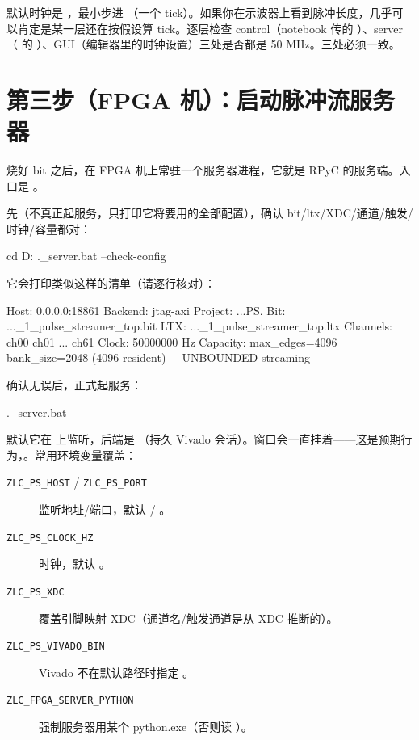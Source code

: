\documentclass[11pt,oneside,openany]{book}
\begin{document}
\begin{notebox}
默认时钟是 ，最小步进 （一个 tick）。如果你在示波器上看到脉冲长度，几乎可以肯定是某一层还在按假设算 tick。逐层检查 control（notebook 传的 ）、server（ 的 ）、GUI（编辑器里的时钟设置）三处是否都是 50 MHz。三处必须一致。
\end{notebox}

\section{第三步（FPGA 机）：启动脉冲流服务器}

烧好 bit 之后，在 FPGA 机上常驻一个服务器进程，它就是 RPyC 的服务端。入口是 。

先（不真正起服务，只打印它将要用的全部配置），确认 bit/ltx/XDC/通道/触发/时钟/容量都对：

\begin{codeblock}[PowerShell]
cd D:\ZLC
.\fpga\run_server.bat --check-config
\end{codeblock}

它会打印类似这样的清单（请逐行核对）：

\begin{codeblock}[text]
Host:    0.0.0.0:18861
Backend: jtag-axi
Project: ...\fpga\build\ps
Bit:     ...\impl_1\zlc_pulse_streamer_top.bit
LTX:     ...\impl_1\zlc_pulse_streamer_top.ltx
Channels: ch00 ch01 ... ch61
Clock:   50000000 Hz
Capacity: max_edges=4096 bank_size=2048 (4096 resident) + UNBOUNDED streaming
\end{codeblock}

确认无误后，正式起服务：

\begin{codeblock}[PowerShell]
.\fpga\run_server.bat
\end{codeblock}

默认它在  上监听，后端是 （持久 Vivado  会话）。窗口会一直挂着——这是预期行为，。常用环境变量覆盖：

\begin{description}
\item[\texttt{ZLC\_PS\_HOST} / \texttt{ZLC\_PS\_PORT}] 监听地址/端口，默认  / 。
\item[\texttt{ZLC\_PS\_CLOCK\_HZ}] 时钟，默认 。
\item[\texttt{ZLC\_PS\_XDC}] 覆盖引脚映射 XDC（通道名/触发通道是从 XDC 推断的）。
\item[\texttt{ZLC\_PS\_VIVADO\_BIN}] Vivado 不在默认路径时指定 。
\item[\texttt{ZLC\_FPGA\_SERVER\_PYTHON}] 强制服务器用某个 python.exe（否则读 ）。
\end{description}
\end{document}
